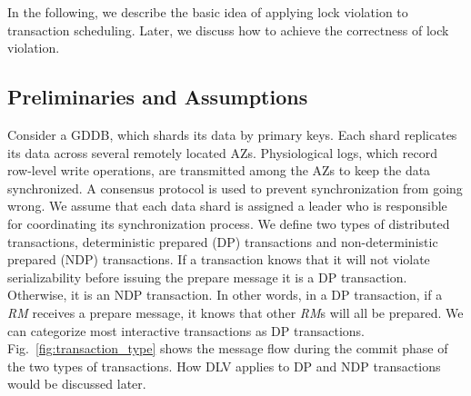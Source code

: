 \documentclass[conference]{IEEEtran}
\begin{document}
In the following, we describe the basic idea of applying lock violation to transaction scheduling.
Later, we discuss how to achieve the correctness of lock violation.

\subsection{Preliminaries and Assumptions}
Consider a GDDB, which shards its data by primary keys.
Each shard replicates its data across several remotely located AZs.
Physiological logs, which record row-level write operations, are transmitted among the AZs to keep the data synchronized.
A consensus protocol is used to prevent synchronization from going wrong.
We assume that each data shard is assigned a leader who is responsible for coordinating its synchronization process.
We define two types of distributed transactions,  deterministic prepared (DP) transactions and non-deterministic prepared (NDP) transactions.
If a transaction knows that it will not violate serializability before issuing the prepare message it is a DP transaction. Otherwise, it is an NDP transaction. 
In other words, in a DP transaction, if a \emph{RM} receives a prepare message, it knows that other \emph{RM}s will all be prepared.
We can categorize most interactive transactions as DP transactions.
Fig.~\ref{fig:transaction_type} shows the message flow during the commit phase of the two types of transactions.
How DLV applies to DP and NDP transactions would be discussed later.

\end{document}
